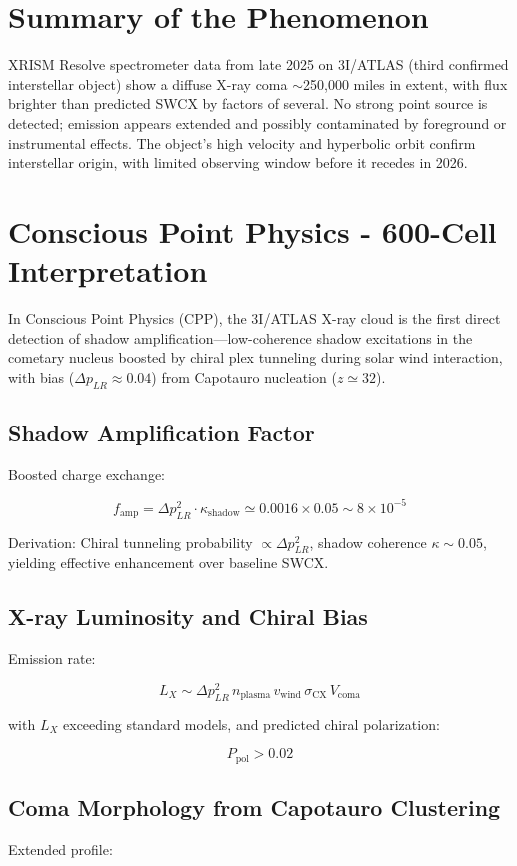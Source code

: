 \documentclass[11pt]{article}
\begin{document}
\section{Summary of the Phenomenon}
XRISM Resolve spectrometer data from late 2025 on 3I/ATLAS (third confirmed interstellar object) show a diffuse X-ray coma $\sim$250,000 miles in extent, with flux brighter than predicted SWCX by factors of several. No strong point source is detected; emission appears extended and possibly contaminated by foreground or instrumental effects. The object's high velocity and hyperbolic orbit confirm interstellar origin, with limited observing window before it recedes in 2026.

\section{Conscious Point Physics - 600-Cell Interpretation}
In Conscious Point Physics (CPP), the 3I/ATLAS X-ray cloud is the first direct detection of shadow amplification—low-coherence shadow excitations in the cometary nucleus boosted by chiral plex tunneling during solar wind interaction, with bias ($\Delta p_{LR} \approx 0.04$) from Capotauro nucleation ($z \simeq 32$).

\subsection{Shadow Amplification Factor}
Boosted charge exchange:

\[
f_{\text{amp}} = \Delta p_{LR}^2 \cdot \kappa_{\text{shadow}} \simeq 0.0016 \times 0.05 \sim 8 \times 10^{-5}
\]

Derivation: Chiral tunneling probability $\propto \Delta p_{LR}^2$, shadow coherence $\kappa \sim 0.05$, yielding effective enhancement over baseline SWCX.

\subsection{X-ray Luminosity and Chiral Bias}
Emission rate:

\[
L_X \sim \Delta p_{LR}^2 \, n_{\text{plasma}} \, v_{\text{wind}} \, \sigma_{\text{CX}} \, V_{\text{coma}}
\]

with $L_X$ exceeding standard models, and predicted chiral polarization:

\[
P_{\text{pol}} > 0.02
\]

\subsection{Coma Morphology from Capotauro Clustering}
Extended profile:
\end{document}
